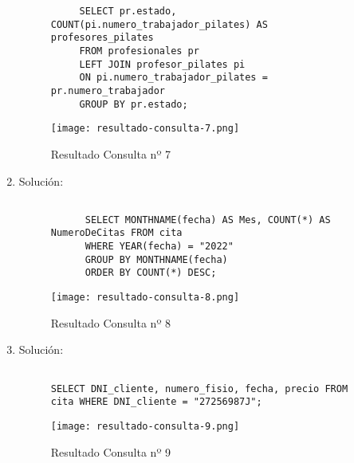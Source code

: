 \begin{enumerate}
\begin{figure}[H]
\begin{tcolorbox}[sharp corners, colback=yellow!30, colframe=white!20]
\begin{verbatim}
     SELECT pr.estado, COUNT(pi.numero_trabajador_pilates) AS profesores_pilates
     FROM profesionales pr
     LEFT JOIN profesor_pilates pi
     ON pi.numero_trabajador_pilates = pr.numero_trabajador
     GROUP BY pr.estado;
            \end{verbatim}
        \end{tcolorbox}
    \end{figure}

    \begin{figure}[H]
        \centering
        \texttt{[image: resultado-consulta-7.png]}
        \caption{Resultado Consulta nº 7}
    \end{figure}

    \item Solución:

    \begin{figure}[H]
        \begin{tcolorbox}[sharp corners, colback=yellow!30, colframe=white!20]
            \scriptsize
            \begin{verbatim}

      SELECT MONTHNAME(fecha) AS Mes, COUNT(*) AS NumeroDeCitas FROM cita
      WHERE YEAR(fecha) = "2022"
      GROUP BY MONTHNAME(fecha)
      ORDER BY COUNT(*) DESC;
            \end{verbatim}
        \end{tcolorbox}
    \end{figure}

    \begin{figure}[H]
        \centering
        \texttt{[image: resultado-consulta-8.png]}
        \caption{Resultado Consulta nº 8}
    \end{figure}

    \item Solución:

    \begin{figure}[H]
        \begin{tcolorbox}[sharp corners, colback=yellow!30, colframe=white!20]
            \scriptsize
            \begin{verbatim}

SELECT DNI_cliente, numero_fisio, fecha, precio FROM cita WHERE DNI_cliente = "27256987J";
            \end{verbatim}
        \end{tcolorbox}
    \end{figure}

    \begin{figure}[H]
        \centering
        \texttt{[image: resultado-consulta-9.png]}
        \caption{Resultado Consulta nº 9}
    \end{figure}


\end{enumerate}

